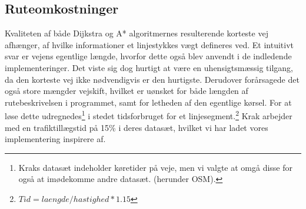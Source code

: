 \subsection{Ruteomkostninger}
\label{subsec:ruteomkostninger}
Kvaliteten af både Dijkstra og A* algoritmernes resulterende korteste vej afhænger, af hvilke informationer et linjestykkes vægt defineres ved. Et intuitivt svar er vejens egentlige længde, hvorfor dette også blev anvendt i de indledende implementeringer. Det viste sig dog hurtigt at være en uhensigtsmæssig tilgang, da den korteste vej ikke nødvendigvis er den hurtigste. Derudover forårsagede det også store mængder vejskift, hvilket er uønsket for både længden af rutebeskrivelsen i programmet, samt for letheden af den egentlige kørsel. For at løse dette udregnedes\footnote{Kraks datasæt indeholder køretider på veje, men vi valgte at omgå disse for også at imødekomme andre datasæt. (herunder OSM).} i stedet tidsforbruget for et linjesegment.\footnote{$Tid=laengde/hastighed*1.15$} Krak arbejder med en trafiktillægstid på 15\% i deres datasæt, hvilket vi har ladet vores implementering inspirere af.